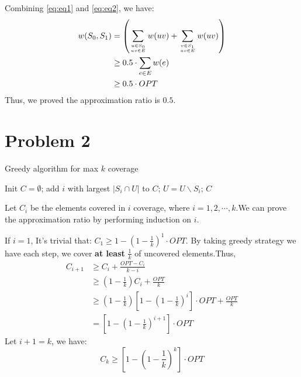 \documentclass[a4paper, 12pt, titlepage]{article}
\begin{document}
Combining \ref{eq:eq1} and \ref{eq:eq2}, we have:
\begin{equation}
    \begin{aligned}
        w(S_0, S_1) &= \left( \sum_{u \in S_0 \atop uv \in E} w(uv) + \sum_{v \in S_1 \atop uv \in E} w(uv) \right) \\
                    &\geq 0.5 \cdot \sum_{e \in E} w(e) \\
                    &\geq 0.5 \cdot OPT
    \end{aligned}
\end{equation}
Thus, we proved the approximation ratio is $0.5$.
\section{Problem 2}
\begin{algorithm}[h]
    \caption{Greedy algorithm for max $k$ coverage}
    \begin{algorithmic}[1]
        \State Init $C = \emptyset$;
 			\State add $i$ with largest $|S_{i} \cap U|$ to $C$;
 			\State $U = U \backslash S_{i}$;
        \EndWhile
        \State \Return $C$
    \end{algorithmic}
\end{algorithm}

Let $C_{i}$ be the elements covered in $i$ coverage, where $i = 1, 2, \cdots, k$.We can prove the approximation ratio by performing induction on $i$.

If $i = 1$, It's trivial that: $C_{1} \geq 1 - \left( 1 - \frac{1}{k} \right)^{1} \cdot OPT$.
By taking greedy strategy we have each step, we cover \textbf{at least} $\frac{1}{k}$ of uncovered elements.Thus,
\begin{equation}
	\begin{aligned}
		C_{i + 1} &\geq C_{i} + \frac{OPT - C_{i}}{k - i} \\
				  &\geq \left(1 - \frac{1}{k} \right) C_{i} + \frac{OPT}{k} \\
				  &\geq \left(1 - \frac{1}{k} \right)\left[ 1 - \left( 1 - \frac{1}{k} \right)^{i} \right] \cdot OPT + \frac{OPT}{k} \\
				  &= \left[ 1 - \left( 1- \frac{1}{k} \right)^{i + 1} \right] \cdot OPT
	\end{aligned}
\end{equation}
Let $i + 1 = k$, we have:
\[
	C_{k} \geq \left[ 1 - \left( 1 - \frac{1}{k} \right)^{k} \right] \cdot OPT
\]
\end{document}
